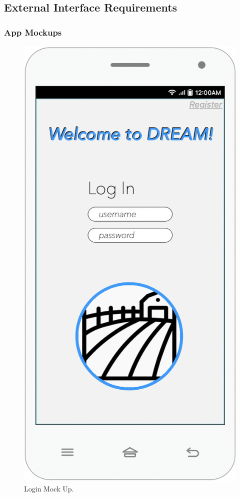 \subsection{External Interface Requirements}

\subsubsection{App Mockups}

 
\begin{multicols}{3}
\begin{figure}[H]

 \centering
\includegraphics[scale=0.35]{../images_diagrams/mock_ups/login100.png}
 \caption{\label{fig:mock_login}Login Mock Up.}
 \end{figure}
 

\end{multicols}
